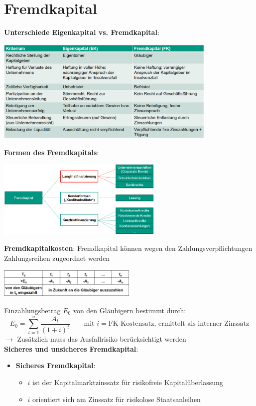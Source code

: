 \section{Fremdkapital}

\textbf{Unterschiede Eigenkapital vs. Fremdkapital}:
\begin{center}
	\includegraphics[width=0.8\textwidth]{images/ek-fk.png}
\end{center}

\textbf{Formen des Fremdkapitals}:
\begin{center}
	\includegraphics[width=0.6\textwidth]{images/formen-fk.png}
\end{center}

\textbf{Fremdkapitalkosten}: Fremdkapital können wegen den Zahlungsverpflichtungen Zahlungsreihen zugeordnet werden
\begin{center}
	\includegraphics[width=0.5\textwidth]{images/fk-zr.png}
\end{center}
Einzahlungsbetrag $E_0$ von den Gläubigern bestimmt durch:
$$E_0=\sum\limits_{t=1}^{n}\frac{A_t}{(1+i)^t}\qquad\text{mit }i=\text{FK-Kostensatz, ermittelt als interner Zinssatz}$$
$\rightarrow$ Zusätzlich muss das Ausfallrisiko berücksichtigt werden\\

\textbf{Sicheres und unsicheres Fremdkapital}:
\begin{itemize}
	\item \textbf{Sicheres Fremdkapital}:
	\begin{itemize}
		\item $i$ ist der Kapitalmarktzinssatz für risikofreie Kapitalüberlassung
		\item $i$ orientiert sich am Zinssatz für risikolose Staatsanleihen
	\end{itemize}
\end{itemize}